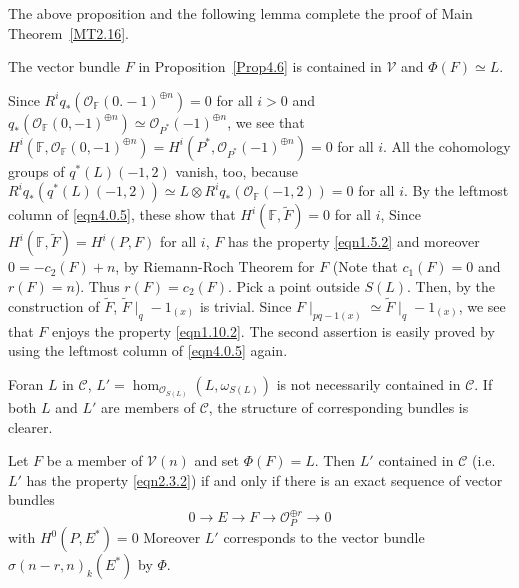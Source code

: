 The above proposition and the following lemma complete the proof of
Main Theorem~\ref{MT2.16}.

\begin{lemma}\label{lemma4.7}
The vector bundle $F$ in Proposition~\ref{Prop4.6} is contained in
$\mathscr{V}$ and $\Phi(F)\simeq L$. 
\end{lemma}

\begin{Proof}
Since $R^{i}q_{\ast}(\mathscr{O}_{\mathbb{F}}(0.-1)^{\oplus n})=0$ for
all $i>0$ and $q_{\ast}(\mathscr{O}_{\mathbb{F}}(0,-1)^{\oplus
  n})\simeq \mathscr{O}_{P^{\ast}}(-1)^{\oplus n}$, we see that
$H^{i}(\mathbb{F},\mathscr{O}_{\mathbb{F}}(0,-1)^{\oplus
  n})=H^{i}(P^{\ast},\mathscr{O}_{P^{\ast}}(-1)^{\oplus n})=0$ for all
$i$. All the cohomology groups of $q^{\ast}(L)(-1,2)$ vanish, too,
because $R^{i}q_{\ast}(q^{\ast}(L)(-1,2))\simeq L\otimes
R^{i}q_{\ast}(\mathscr{O}_{\mathbb{F}}(-1,2))=0$ for all $i$. By the
leftmost column of \eqref{eqn4.0.5}, these show that
$H^{i}\left(\mathbb{F},\widetilde{F}\right)=0$ for all $i$, Since
$H^{i}\left(\mathbb{F},\widetilde{F}\right)=H^{i}(P,F)$ for all $i$,
$F$ has the property \eqref{eqn1.5.2} and moreover $0=-c_2(F)+n$, by
Riemann-Roch Theorem for $F$ (Note that $c_1(F)=0$ and $r(F)=n$). Thus
$r(F)=c_2(F)$. Pick a point outside $S(L)$. Then, by the construction
of $\widetilde{F}$, $\widetilde{F}\mid_q-1_{(x)}$ is trivial. Since
$F\mid_{p q-1(x)}\simeq \widetilde{F}\mid_q-1_{(x)}$, we see that $F$
enjoys the property \eqref{eqn1.10.2}. The second assertion is easily
proved by using the leftmost column of \eqref{eqn4.0.5} again.
\enprf
\end{Proof}

For\pageoriginale an $L$ in $\mathscr{C}$,
$L'=\hom_{\mathscr{O}_{S(L)}}(L,\omega_{S(L)})$ is not necessarily
contained in $\mathscr{C}$. If both $L$ and $L'$ are members of
$\mathscr{C}$, the structure of corresponding bundles is clearer.

\begin{Theorem}\label{Theorem4.8}
Let $F$ be a member of $\mathscr{V}(n)$ and set $\Phi(F)=L$. Then $L'$
contained in $\mathscr{C}$ (i.e. $L'$ has the property
\eqref{eqn2.3.2}) if and only if there is an exact sequence of vector
bundles 
\setcounter{equation}{0}
\begin{equation}\label{eqn4.8.1}
0\to E\to F\to \mathscr{O}^{\oplus r}_P\to 0
\end{equation}
with $H^{0}(P,E^{\ast})=0$ Moreover $L'$ corresponds to the vector
bundle $\sigma(n-r,n)_k(E^{\ast})$ by $\Phi$.
\end{Theorem}

